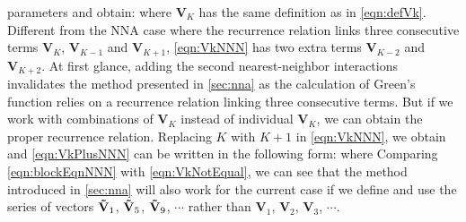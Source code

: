 parameters and obtain:
where $\mathbf{V}_{K}$ has the same definition as in \autoref{eqn:defVk}. Different from the NNA case where 
the recurrence relation links three consecutive terms $\mathbf{V}_{K}$, $\mathbf{V}_{K-1}$ and 
 $\mathbf{V}_{K+1}$, \autoref{eqn:VkNNN} has two extra terms $\mathbf{V}_{K-2}$ and 
 $\mathbf{V}_{K+2}$.  At first glance, adding the second nearest-neighbor interactions invalidates the method presented in \autoref{sec:nna} as the calculation of Green's 
function relies on a recurrence relation linking three consecutive terms. But if we work with combinations of 
$\mathbf{V}_K$ instead of individual $\mathbf{V}_K$, we can obtain the proper recurrence relation. Replacing $K$
with $K+1$ in \autoref{eqn:VkNNN}, we obtain
 and \autoref{eqn:VkPlusNNN} can be written in the following form:
where
Comparing \autoref{eqn:blockEqnNNN} with \autoref{eqn:VkNotEqual}, we can see that the method introduced
in \autoref{sec:nna} will also work for the current case if we define
and use the series of vectors $\mathbf{\Tilde{V}}_{1}$, $\mathbf{\Tilde{V}}_{5}$, $\mathbf{\Tilde{V}}_{9}$,
 $\cdots$ rather than $\mathbf{V}_{1}$, $\mathbf{V}_{2}$, $\mathbf{V}_{3}$, $\cdots$.

